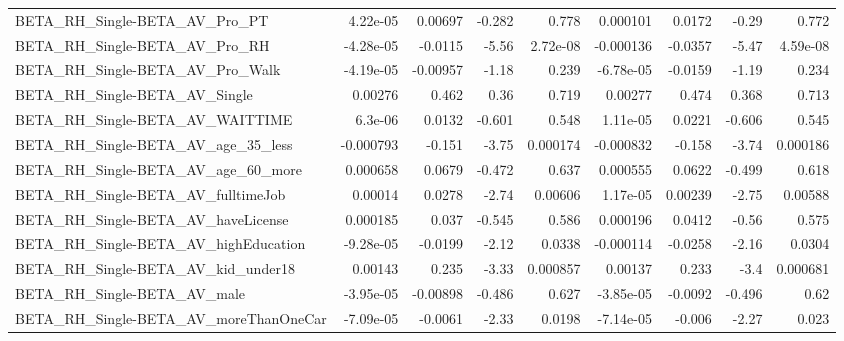 \begin{tabular}{lrrrrrrrr}
BETA\_RH\_Single-BETA\_AV\_Pro\_PT                      &    4.22e-05 &      0.00697 &    -0.282 &    0.778 &   0.000101 &      0.0172 &        -0.29 &         0.772 \\
BETA\_RH\_Single-BETA\_AV\_Pro\_RH                      &   -4.28e-05 &      -0.0115 &     -5.56 & 2.72e-08 &  -0.000136 &     -0.0357 &        -5.47 &      4.59e-08 \\
BETA\_RH\_Single-BETA\_AV\_Pro\_Walk                    &   -4.19e-05 &     -0.00957 &     -1.18 &    0.239 &  -6.78e-05 &     -0.0159 &        -1.19 &         0.234 \\
BETA\_RH\_Single-BETA\_AV\_Single                      &     0.00276 &        0.462 &      0.36 &    0.719 &    0.00277 &       0.474 &        0.368 &         0.713 \\
BETA\_RH\_Single-BETA\_AV\_WAITTIME                    &     6.3e-06 &       0.0132 &    -0.601 &    0.548 &   1.11e-05 &      0.0221 &       -0.606 &         0.545 \\
BETA\_RH\_Single-BETA\_AV\_age\_35\_less                 &   -0.000793 &       -0.151 &     -3.75 & 0.000174 &  -0.000832 &      -0.158 &        -3.74 &      0.000186 \\
BETA\_RH\_Single-BETA\_AV\_age\_60\_more                 &    0.000658 &       0.0679 &    -0.472 &    0.637 &   0.000555 &      0.0622 &       -0.499 &         0.618 \\
BETA\_RH\_Single-BETA\_AV\_fulltimeJob                 &     0.00014 &       0.0278 &     -2.74 &  0.00606 &   1.17e-05 &     0.00239 &        -2.75 &       0.00588 \\
BETA\_RH\_Single-BETA\_AV\_haveLicense                 &    0.000185 &        0.037 &    -0.545 &    0.586 &   0.000196 &      0.0412 &        -0.56 &         0.575 \\
BETA\_RH\_Single-BETA\_AV\_highEducation               &   -9.28e-05 &      -0.0199 &     -2.12 &   0.0338 &  -0.000114 &     -0.0258 &        -2.16 &        0.0304 \\
BETA\_RH\_Single-BETA\_AV\_kid\_under18                 &     0.00143 &        0.235 &     -3.33 & 0.000857 &    0.00137 &       0.233 &         -3.4 &      0.000681 \\
BETA\_RH\_Single-BETA\_AV\_male                        &   -3.95e-05 &     -0.00898 &    -0.486 &    0.627 &  -3.85e-05 &     -0.0092 &       -0.496 &          0.62 \\
BETA\_RH\_Single-BETA\_AV\_moreThanOneCar              &   -7.09e-05 &      -0.0061 &     -2.33 &   0.0198 &  -7.14e-05 &      -0.006 &        -2.27 &         0.023 \\

\end{tabular}
